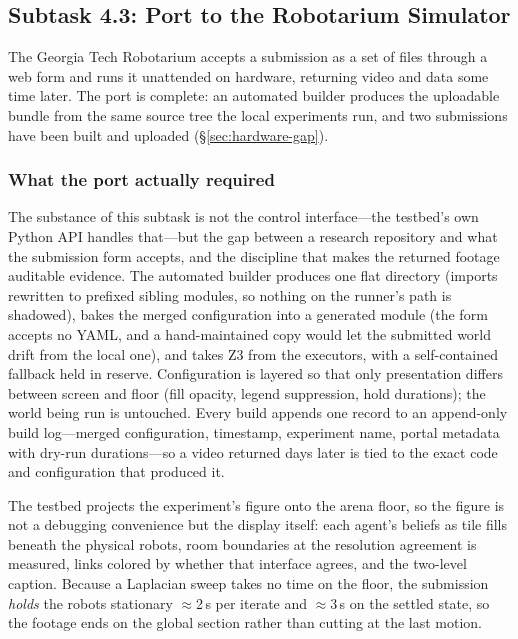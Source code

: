 \documentclass[11pt]{article}
\newif\ifshowcomments
\theoremstyle{definition}
\theoremstyle{remark}
\newcommand{\prompt}[1]{%
    \ifshowcomments
        ~\todo[inline, color=techgold!80, textcolor=black,caption={Task}]{{\bf Prompt:} #1}%
    \fi
}
\begin{document}
\subsection{Subtask 4.3: Port to the Robotarium Simulator}
\label{sec:subtask43}

\prompt{Adapt the code to the Robotarium environment, interfacing with UGV controls for
real-world simulation. Deliverable: Simulator-compatible code, part of Milestone 4's
deliverables.}

The Georgia Tech Robotarium accepts a submission as a set of files through a web form and runs
it unattended on hardware, returning video and data some time later.
The port is complete: an automated builder produces the uploadable bundle from the same source
tree the local experiments run, and two submissions have been built and uploaded
(\S\ref{sec:hardware-gap}).

\subsubsection{What the port actually required}

The substance of this subtask is not the control interface---the testbed's own Python API
handles that---but the gap between a research repository and what the submission form accepts,
and the discipline that makes the returned footage auditable evidence.
The automated builder produces one flat directory (imports rewritten to prefixed sibling
modules, so nothing on the runner's path is shadowed), bakes the merged configuration into a
generated module (the form accepts no YAML, and a hand-maintained copy would let the submitted
world drift from the local one), and takes Z3 from the executors, with a self-contained
fallback held in reserve.
Configuration is layered so that only presentation differs between screen and floor (fill
opacity, legend suppression, hold durations); the world being run is untouched.
Every build appends one record to an append-only build log---merged configuration, timestamp,
experiment name, portal metadata with dry-run durations---so a video returned days later is
tied to the exact code and configuration that produced it.

The testbed projects the experiment's figure onto the arena floor, so the figure is not a
debugging convenience but the display itself: each agent's beliefs as tile fills beneath the
physical robots, room boundaries at the resolution agreement is measured, links colored by
whether that interface agrees, and the two-level caption.
Because a Laplacian sweep takes no time on the floor, the submission \emph{holds} the robots
stationary $\approx$2\,s per iterate and $\approx$3\,s on the settled state, so the footage
ends on the global section rather than cutting at the last motion.
\end{document}
